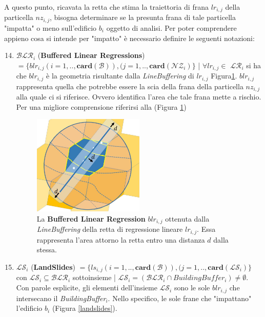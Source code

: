 A questo punto, ricavata la retta che stima la traiettoria di frana $lr_{i,j}$ della particella $nz_{i,j}$, bisogna determinare se la presunta frana di tale particella "impatta" o meno sull'edificio $b_i$ oggetto di analisi. Per poter comprendere appieno cosa si intende per "impatto" è necessario definire le seguenti notazioni:

\begin{enumerate}
	\setcounter{enumi}{13}
	\item \textbf{$ \mathcal{BLR}_i $} (\textbf{Buffered Linear Regressions}) $= \{blr_{i,j}(i=1,..,\mathbf{card}(\mathcal{B})),(j=1,..,\mathbf{card}(\mathcal{NZ}_i)\}$ | $\forall lr_{i,j} \in $ \textbf{$ \mathcal{LR}_i $} si ha che $blr_{i,j}$ è la geometria risultante dalla \textit{LineBuffering} di $lr_{i,j}$ Figura\ref{buffer_regression}. $blr_{i,j}$ rappresenta quella che potrebbe essere la scia della frana della particella $nz_{i,j}$ alla quale ci si riferisce. Ovvero identifica l'area che tale frana mette a rischio. 
	Per una migliore comprensione riferirsi alla (Figura \ref{buffer_regression})
	
	\begin{figure}[h]
		\centering
		\includegraphics[width=0.5\textwidth]{images/buffer_rect}
		\caption{La \textbf{Buffered Linear Regression} $blr_{i,j}$ ottenuta dalla \textit{LineBuffering} della retta di regressione lineare $lr_{i,j}$. Essa rappresenta l'area attorno la retta entro una distanza $d$ dalla stessa.}
		\label{buffer_regression}
	\end{figure}
	
	\item \textbf{$ \mathcal{LS}_i $} (\textbf{LandSlides}) $ = \{ls_{i,j}(i=1,..,\mathbf{card}(\mathcal{B})),(j=1,..,\mathbf{card}(\mathcal{LS}_i)\}$ con $\mathcal{LS}_i \subseteq \mathcal{BLR}_i$  sottoinsieme | $\mathcal{LS}_i = (\mathcal{BLR}_i  \cap BuildingBuffer_i)	\not= \emptyset $.
	Con parole esplicite, gli elementi dell'insieme $ \mathcal{LS}_i $ sono	le sole $blr_{i,j}$ che intersecano il \textit{BuildingBuffer$_i$}. Nello specifico, le sole frane che "impattano" l'edificio $b_i$ (Figura \ref{landslides}).
	

\end{enumerate}
